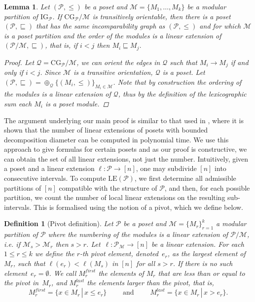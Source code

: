 \documentclass[9pt,a4paper,oneside]{article}
\newtheorem{lemma}[theorem]{Lemma}
\newtheorem{definition}[theorem]{Definition}
\newcommand{\cM}{\mathcal{M}}
\newcommand{\cQ}{\mathcal{Q}}
\newcommand{\cP}{\mathcal{P}}
\newcommand{\CG}{\mathrm{CG}}
\newcommand{\IG}{\mathrm{IG}}
\newcommand{\lex}{\mathrm{LE}}
\begin{document}
\begin{lemma}\label{lem:reorient2}
Let $(\cP, \leq)$ be a poset and $\cM=\{M_1,\ldots,M_k\}$ be a modular partition of $\IG_\cP$.
If $\CG_\cP/\cM$ is transitively orientable, then there is a poset $(\cP, \sqsubseteq)$ that has the same incomparability graph as $(\cP, \leq)$ and for which $\cM$ is a poset partition and the order of the modules is a linear extension of $(\cP/\cM, \sqsubseteq)$, that is, if $i<j$ then $M_i\sqsubseteq M_j$.
\begin{proof}
Let $\cQ=\CG_\cP/\cM$, we can orient the edges in $\cQ$ such that $M_i\rightarrow M_j$ if and only if $i<j$. 
Since $\cM$ is a transitive orientation, $\cQ$ is a poset. Let $(\cP, \sqsubseteq)= \oplus_\cQ \{(M_i, \leq)\}_{M_i\in\cM}$.
Note that by construction the ordering of the modules is a linear extension of $\cQ$, thus by the definition of the lexicographic sum
each $M_i$ is a poset module.
\end{proof}
\end{lemma}



The argument underlying our main proof is similar to that used in \cite[Proposition 3.4]{Hab87}, where it is shown that the number of linear extensions of posets with bounded decomposition diameter can be computed in polynomial time. We use this approach to give formulas for certain posets and as our proof is constructive, we can obtain the set of all linear extensions, not just the number.
Intuitively, given a poset and a linear extension $\ell:\cP\to [n]$, one may subdivide $[n]$  into consecutive intervals. To compute $\lex(\cP)$, we first determine all admissible partitions of $[n]$  compatible with the structure of $\cP$, and then, for each possible partition, we count the number of local linear extensions on the resulting sub-intervals. This is formalised using the notion of a pivot, which we define below.


\begin{definition}[Pivot definition]\label{def:pivot}
Let $\cP$ be a poset and $\cM=\{M_r\}_{r=1}^{k}$ a modular partition of $\cP$ where
the numbering of the modules is a linear extension of $\cP/\cM$, i.e. if $\cM_s > \cM_r$  then $s>r$. 
Let~$\ell:\cP_\cM\to [n]$ be a linear extension.  
For each $1\leq r \leq k$ we define the 
\emph{$r$-th pivot element}, denoted~$e_r$, as the largest element of $M_r$, such that $\ell(e_r) < \ell(M_s)$ in $[n]$ for all $s>r$.  If there is no such element~$e_r=\emptyset$. 
We call $M_r^{first}$ the elements of $M_r$ that are less than or equal to the pivot in~$M_r$, and $M_r^{last}$ the elements larger than the pivot,  that is, 
\[M_r^{first} =  \{x\in M_r\,|\, x\leq e_r\}
\quad\quad \text{ and } \quad\quad
M_r^{last} =  \{x\in M_r\,|\, x > e_r\}.\]
\end{definition}
\end{document}
